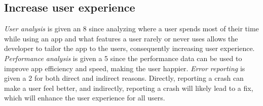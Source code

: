 \documentclass[paper=letter, fontsize=12pt]{scrartcl} %
\numberwithin{equation}{section} %
\numberwithin{figure}{section} %
\numberwithin{table}{section} %
\begin{document}
\subsection{Increase user experience}
\hspace*{.5cm} \textit{User analysis} is given an 8 since analyzing where a user spends most of their time while using an app and what features a user rarely or never uses allows the developer to tailor the app to the users, consequently increasing user experience. \textit{Performance analysis} is given a 5 since the performance data can be used to improve app efficiency and speed, making the user happier. \textit{Error reporting} is given a 2 for both direct and indirect reasons. Directly, reporting a crash can make a user feel better, and indirectly, reporting a crash will likely lead to a fix, which will enhance the user experience for all users.


\end{document}
